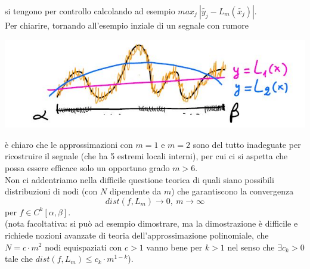 \documentclass[12pt,a4paper]{article}
\begin{document}
si tengono per controllo calcolando ad esempio $max_j\  |\tilde{y_j}-L_m(\tilde{x_j})|$.\\Per chiarire, tornando all'esempio inziale di un segnale con rumore
\begin{center}
    \includegraphics[scale=0.7]{calcolo32.JPG}
\end{center}
è chiaro che le approssimazioni con $m=1$ e $m=2$ sono del tutto inadeguate per ricostruire il segnale (che ha 5 estremi locali interni), per cui ci si aspetta che possa essere efficace solo un opportuno grado $m>6$.\\
Non ci addentriamo nella difficile questione teorica di quali siano possibili distribuzioni di nodi (con $N$ dipendente da $m$) che garantiscono la convergenza 
\[
dist(f, L_m) \to 0, \ m \to \infty
\]
per $f \in C^k[\alpha, \beta]$.\\
(nota facoltativa: si può ad esempio dimostrare, ma la dimostrazione è difficile e richiede nozioni avanzate di teoria dell'approssimazione polinomiale, che $N = c \cdot m^2$ nodi equispaziati con $c>1$ vanno bene per $k>1$ nel senso che $\exists c_k > 0$ tale che $dist(f,L_m) \leq c_k \cdot m^{1-k}$).
\end{document}
